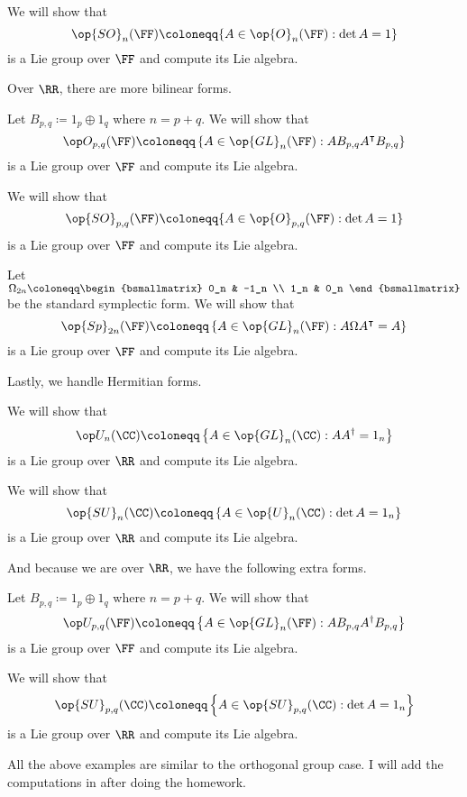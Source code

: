 \documentclass[../notes.tex]{subfiles}
\begin{document}
\begin{example}
	We will show that
	\[\op{SO}_n(\FF)\coloneqq\{A\in\op{O}_n(\FF):\det A=1\}\]
	is a Lie group over $\FF$ and compute its Lie algebra.
\end{example}
Over $\RR$, there are more bilinear forms.
\begin{example}
	Let $B_{p,q}\coloneqq1_p\oplus1_q$ where $n=p+q$. We will show that
	\[\op O_{p,q}(\FF)\coloneqq\left\{A\in\op{GL}_n(\FF):AB_{p,q}A^\intercal B_{p,q}\right\}\]
	is a Lie group over $\FF$ and compute its Lie algebra.
\end{example}
\begin{example}
	We will show that
	\[\op{SO}_{p,q}(\FF)\coloneqq\{A\in\op{O}_{p,q}(\FF):\det A=1\}\]
	is a Lie group over $\FF$ and compute its Lie algebra.
\end{example}
\begin{example}
	Let $\Omega_{2n}\coloneqq\begin{bsmallmatrix}
		0_n & -1_n \\
		1_n & 0_n
	\end{bsmallmatrix}$ be the standard symplectic form. We will show that
	\[\op{Sp}_{2n}(\FF)\coloneqq\left\{A\in\op{GL}_n(\FF):A\Omega A^\intercal=A\right\}\]
	is a Lie group over $\FF$ and compute its Lie algebra.
\end{example}
Lastly, we handle Hermitian forms.
\begin{example}
	We will show that
	\[\op U_n(\CC)\coloneqq\left\{A\in\op{GL}_n(\CC):AA^\dagger=1_n\right\}\]
	is a Lie group over $\RR$ and compute its Lie algebra.
\end{example}
\begin{example}
	We will show that
	\[\op{SU}_n(\CC)\coloneqq\left\{A\in\op{U}_n(\CC):\det A=1_n\right\}\]
	is a Lie group over $\RR$ and compute its Lie algebra.
\end{example}
And because we are over $\RR$, we have the following extra forms.
\begin{example}
	Let $B_{p,q}\coloneqq1_p\oplus1_q$ where $n=p+q$. We will show that
	\[\op U_{p,q}(\FF)\coloneqq\left\{A\in\op{GL}_n(\FF):AB_{p,q}A^\dagger B_{p,q}\right\}\]
	is a Lie group over $\FF$ and compute its Lie algebra.
\end{example}
\begin{example}
	We will show that
	\[\op{SU}_{p,q}(\CC)\coloneqq\left\{A\in\op{SU}_{p,q}(\CC):\det A=1_n\right\}\]
	is a Lie group over $\RR$ and compute its Lie algebra.
\end{example}
All the above examples are similar to the orthogonal group case. I will add the computations in after doing the homework.
\end{document}
